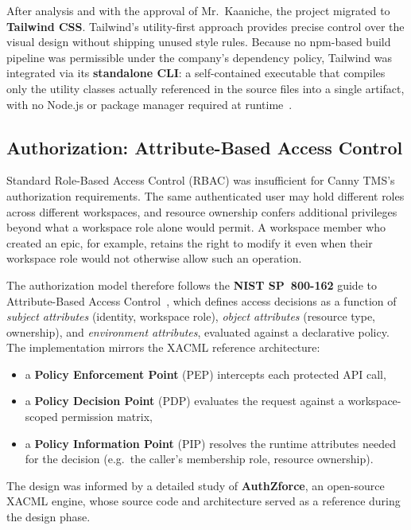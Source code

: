 After analysis and with the approval of Mr.~Kaaniche, the project migrated to
\textbf{Tailwind CSS}. Tailwind's utility-first approach provides precise control over
the visual design without shipping unused style rules. Because no npm-based build pipeline
was permissible under the company's dependency policy, Tailwind was integrated via its
\textbf{standalone CLI}: a self-contained executable that compiles only the utility classes
actually referenced in the source files into a single artifact, with no Node.js or package
manager required at runtime~\cite{tailwindStandaloneCLI}.

\subsection{Authorization: Attribute-Based Access Control}

Standard Role-Based Access Control (RBAC) was insufficient for Canny TMS's authorization
requirements. The same authenticated user may hold different roles across different
workspaces, and resource ownership confers additional privileges beyond what a workspace
role alone would permit. A workspace member who created an epic, for example, retains
the right to modify it even when their workspace role would not otherwise allow such an
operation.

The authorization model therefore follows the \textbf{NIST SP~800-162} guide to
Attribute-Based Access Control~\cite{nistABAC}, which defines access decisions as a
function of \emph{subject attributes} (identity, workspace role), \emph{object attributes}
(resource type, ownership), and \emph{environment attributes}, evaluated against a
declarative policy. The implementation mirrors the XACML reference architecture:

\begin{itemize}
    \item a \textbf{Policy Enforcement Point} (PEP) intercepts each protected API call,
    \item a \textbf{Policy Decision Point} (PDP) evaluates the request against a
          workspace-scoped permission matrix,
    \item a \textbf{Policy Information Point} (PIP) resolves the runtime attributes
          needed for the decision (e.g.\ the caller's membership role, resource
          ownership).
\end{itemize}

The design was informed by a detailed study of \textbf{AuthZforce}, an open-source XACML
engine, whose source code and architecture served as a reference during the design phase.

